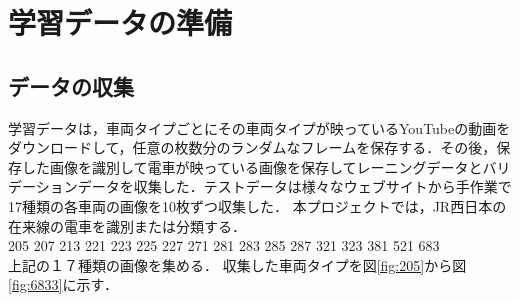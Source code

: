 

\chapter{学習データの準備}\label{genri}

\section{データの収集}
学習データは，車両タイプごとにその車両タイプが映っているYouTubeの動画をダウンロードして，任意の枚数分のランダムなフレームを保存する．その後，保存した画像を識別して電車が映っている画像を保存してレーニングデータとバリデーションデータを収集した．テストデータは様々なウェブサイトから手作業で17種類の各車両の画像を10枚ずつ収集した．
本プロジェクトでは，JR西日本の在来線の電車を識別または分類する．\\
205  207  213  221  223  225  227  271  281  283  285  287  321  323  381  521  683 \\
上記の１７種類の画像を集める．
収集した車両タイプを図\ref{fig:205}から図\ref{fig:6833}に示す．

